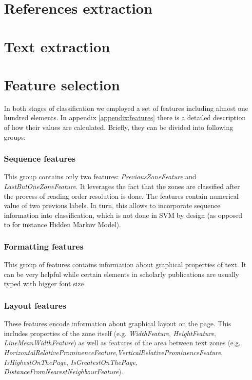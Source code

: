 \section{References extraction}
\section{Text extraction}
\section{Feature selection}
In both stages of classification we employed a set of features including almost one hundred elements. In appendix \ref{appendix:features} there is a detailed description of how their values are calculated. Briefly, they can be divided into following groups:
\subsubsection{Sequence features}
This group contains only two features: \textit{PreviousZoneFeature} and \textit{LastButOneZoneFeature}. It leverages the fact that the zones are classified after the process of reading order resolution is done. The features contain numerical value of two previous labels. In turn, this allows to incorporate sequence information into classification, which is not done in SVM by design (as opposed to for instance Hidden Markov Model).
\subsubsection{Formatting features}
This group of features contains information about graphical properties of text. It can be very helpful while certain elements in scholarly publications are usually typed with bigger font size
\subsubsection{Layout features}
These features encode information about graphical layout on the page. This includes properties of the zone itself (e.g. \textit{WidthFeature}, \textit{HeightFeature}, \textit{LineMeanWidthFeature}) as well as features of the area between text zones (e.g. \textit{HorizontalRelativeProminenceFeature},\textit{VerticalRelativeProminenceFeature}, \textit{IsHighestOnThePage}, \textit{IsGreatestOnThePage}, \textit{DistanceFromNearestNeighbourFeature}). 
